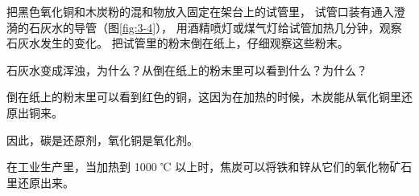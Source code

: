 \wrapfiguretrick

\begin{shiyan}
    把黑色氧化铜和木炭粉的混和物放入固定在架台上的试管里，
    试管口装有通入澄漪的石灰水的导管（图\ref{fig:3-4}），
    用酒精喷灯或煤气灯给试管加热几分钟，观察石灰水发生的变化。
    把试管里的粉末倒在纸上，仔细观察这些粉末。
\end{shiyan}

石灰水变成浑浊，为什么？从倒在纸上的粉末里可以看到什么？为什么？

倒在纸上的粉末里可以看到红色的铜，这因为在加热的时候，木炭能从氧化铜里还原出铜来。
\begin{fangchengshi}
\end{fangchengshi}

因此，碳是还原剂，氧化铜是氧化剂。

在工业生产里，当加热到 1000 ℃ 以上时，焦炭可以将铁和锌从它们的氧化物矿石里还原出来。


\begin{xiti}






\end{xiti}

